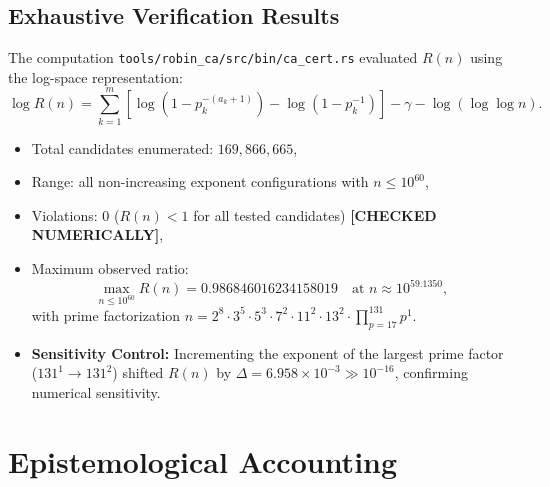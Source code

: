 \documentclass[11pt,a4paper]{article}
\theoremstyle{remark}
\begin{document}
\subsection{Exhaustive Verification Results}
The computation \texttt{tools/robin\_ca/src/bin/ca\_cert.rs} evaluated $R(n)$ using the log-space representation:
\begin{equation}
 \log R(n) = \sum_{k=1}^m \left[ \log\left(1 - p_k^{-(a_k+1)}\right) - \log\left(1 - p_k^{-1}\right) \right] - \gamma - \log(\log\log n).
\end{equation}
\begin{itemize}
\item Total candidates enumerated: $169{,}866{,}665$,
\item Range: all non-increasing exponent configurations with $n \le 10^{60}$,
\item Violations: $0$ ($R(n) < 1$ for all tested candidates) \textbf{[CHECKED NUMERICALLY]},
\item Maximum observed ratio:
\[
 \max_{n \le 10^{60}} R(n) = 0.986846016234158019 \quad \text{at } n \approx 10^{59.1350},
\]
with prime factorization $n = 2^8 \cdot 3^5 \cdot 5^3 \cdot 7^2 \cdot 11^2 \cdot 13^2 \cdot \prod_{p=17}^{131} p^1$.
\item \textbf{Sensitivity Control:} Incrementing the exponent of the largest prime factor ($131^1 \to 131^2$) shifted $R(n)$ by $\Delta = 6.958 \times 10^{-3} \gg 10^{-16}$, confirming numerical sensitivity.
\end{itemize}

\section{Epistemological Accounting}
\end{document}
